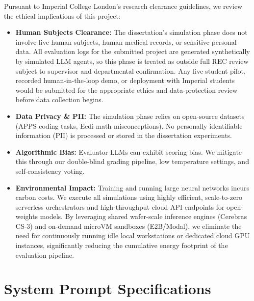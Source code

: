 \documentclass[11pt,a4paper]{report}
\begin{document}
Pursuant to Imperial College London's research clearance guidelines, we review the ethical implications of this project:
\begin{itemize}
    \item \textbf{Human Subjects Clearance:} The dissertation's simulation phase does not involve live human subjects, human medical records, or sensitive personal data. All evaluation logs for the submitted project are generated synthetically by simulated LLM agents, so this phase is treated as outside full REC review subject to supervisor and departmental confirmation. Any live student pilot, recorded human-in-the-loop demo, or deployment with Imperial students would be submitted for the appropriate ethics and data-protection review before data collection begins.
    \item \textbf{Data Privacy \& PII:} The simulation phase relies on open-source datasets (APPS coding tasks, Eedi math misconceptions). No personally identifiable information (PII) is processed or stored in the dissertation experiments.
    \item \textbf{Algorithmic Bias:} Evaluator LLMs can exhibit scoring bias. We mitigate this through our double-blind grading pipeline, low temperature settings, and self-consistency voting.
    \item \textbf{Environmental Impact:} Training and running large neural networks incurs carbon costs. We execute all simulations using highly efficient, scale-to-zero serverless orchestrators and high-throughput cloud API endpoints for open-weights models. By leveraging shared wafer-scale inference engines (Cerebras CS-3) and on-demand microVM sandboxes (E2B/Modal), we eliminate the need for continuously running idle local workstations or dedicated cloud GPU instances, significantly reducing the cumulative energy footprint of the evaluation pipeline.
\end{itemize}

\renewcommand{\bibname}{References}



\appendix
\chapter{System Prompt Specifications}
\label{app:prompts}
\end{document}
